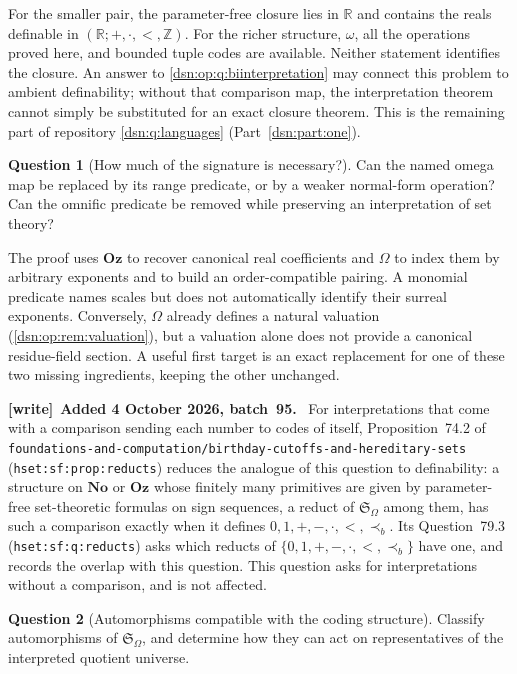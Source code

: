 \documentclass[11pt,a4paper]{article}
\numberwithin{equation}{section}
\theoremstyle{definition}
\newtheorem{question}[question]{Question}
\theoremstyle{remark}
\newcommand{\No}{\mathbf{No}}
\newcommand{\Oz}{\mathbf{Oz}}
\newcommand{\Z}{\mathbb Z}
\newcommand{\R}{\mathbb R}
\newcommand{\repopath}[1]{\nolinkurl{#1}}
\newcommand{\lbl}[1]{\nolinkurl{#1}}
\newenvironment{writenote}[1][]{\par\medskip\begingroup\small\noindent\textbf{[write]}\if\relax\detokenize{#1}\relax\else~\textbf{#1.}\fi~\ignorespaces}{\par\endgroup\medskip}
\newcommand{\Somega}{\mathfrak S_\Omega}
\begin{document}
For the smaller pair, the parameter-free closure lies in \(\R\) and
contains the reals definable in \((\R;+,\cdot,<,\Z)\).
For the richer structure, \(\omega\), all the operations proved here,
and bounded tuple codes are available.  Neither statement identifies the
closure.  An answer to \cref{dsn:op:q:biinterpretation} may connect this problem
to ambient definability; without that comparison map, the interpretation
theorem cannot simply be substituted for an exact closure theorem.
This is the remaining part of repository \cref{dsn:q:languages} (Part~\ref{dsn:part:one}).

\begin{question}[How much of the signature is necessary?]
Can the named omega map be replaced by its range predicate, or by a
weaker normal-form operation?  Can the omnific predicate be removed
while preserving an interpretation of set theory?
\end{question}

The proof uses \(\Oz\) to recover canonical real coefficients and
\(\Omega\) to index them by arbitrary exponents and to build an
order-compatible pairing.  A monomial predicate names scales but does
not automatically identify their surreal exponents.  Conversely,
\(\Omega\) already defines a natural valuation
(\cref{dsn:op:rem:valuation}), but a valuation alone does not provide a
canonical residue-field section.  A useful first target is an exact
replacement for one of these two missing ingredients, keeping the
other unchanged.

\begin{writenote}[Added 4 October 2026, batch~95]
For interpretations that come with a comparison sending each number to codes
of itself, Proposition~74.2 of
\repopath{foundations-and-computation/birthday-cutoffs-and-hereditary-sets}
(\lbl{hset:sf:prop:reducts}) reduces the analogue of this question to
definability: a structure on $\No$ or $\Oz$ whose finitely many primitives are
given by parameter-free set-theoretic formulas on sign sequences, a reduct of
$\Somega$ among them, has such a comparison exactly when it defines
$0,1,+,-,\cdot,<,\prec_b$. Its Question~79.3 (\lbl{hset:sf:q:reducts}) asks which
reducts of $\{0,1,+,-,\cdot,<,\prec_b\}$ have one, and records the overlap with
this question. This question asks for interpretations without a comparison,
and is not affected.
\end{writenote}

\begin{question}[Automorphisms compatible with the coding structure]
Classify automorphisms of \(\Somega\), and determine how they can act
on representatives of the interpreted quotient universe.
\end{question}
\end{document}
